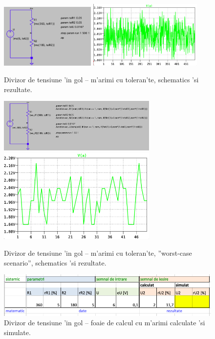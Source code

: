 \begin{figure}[t]
	\centering
		\includegraphics[width=0.42\textwidth]{laborator_01/figuri/spice_schematics_tolerante}
		\includegraphics[width=0.5\textwidth]{laborator_01/figuri/spice_rezultate_tolerante}
	\caption{Divizor de tensiune 'in gol -- m'arimi cu toleran'te, schematics 'si rezultate.}
	\label{fig:spice_tolerante}
\end{figure}
\begin{figure}[t]
	\centering
		\includegraphics[width=0.7\textwidth]{laborator_01/figuri/spice_schematics_tolerante_wc}\\
		\includegraphics[width=0.7\textwidth]{laborator_01/figuri/spice_rezultate_tolerante_wc}
	\caption{Divizor de tensiune 'in gol -- m'arimi cu toleran'te, ''worst-case scenario'', schematics 'si rezultate.}
	\label{fig:spice_tolerante_wc}
\end{figure}
\begin{figure}[b]
	\centering
		\includegraphics[width=\textwidth]{laborator_01/figuri/divizor_tensiune_excel2}
	\caption{Divizor de tensiune 'in gol -- foaie de calcul cu m'arimi calculate 'si simulate.}
	\label{fig:divizor_tensiune_excel2}
\end{figure}

